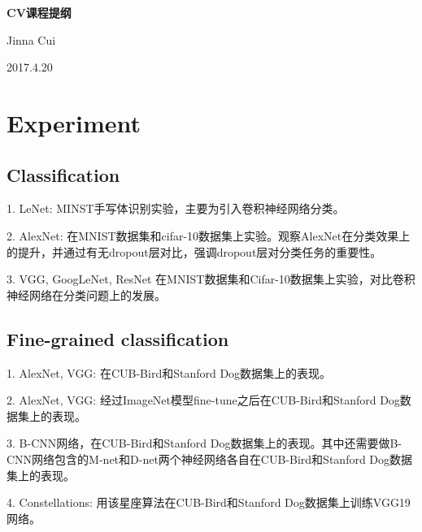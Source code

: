 \documentclass[UTF8]{article}
\begin{document}

\begin{center}
\textbf{\LARGE{CV课程提纲}} %
\end{center}

\begin{center}
Jinna Cui
\end{center}

\begin{center}
2017.4.20
\end{center}
\section{Experiment}
\subsection{Classification}
1. LeNet: MINST手写体识别实验，主要为引入卷积神经网络分类。

2. AlexNet: 在MNIST数据集和cifar-10数据集上实验。观察AlexNet在分类效果上的提升，并通过有无dropout层对比，强调dropout层对分类任务的重要性。

3. VGG, GoogLeNet, ResNet 在MNIST数据集和Cifar-10数据集上实验，对比卷积神经网络在分类问题上的发展。
\subsection{Fine-grained classification}
1. AlexNet, VGG: 在CUB-Bird和Stanford Dog数据集上的表现。

2. AlexNet, VGG: 经过ImageNet模型fine-tune之后在CUB-Bird和Stanford Dog数据集上的表现。

3. B-CNN网络，在CUB-Bird和Stanford Dog数据集上的表现。其中还需要做B-CNN网络包含的M-net和D-net两个神经网络各自在CUB-Bird和Stanford Dog数据集上的表现。

4. Constellations: 用该星座算法在CUB-Bird和Stanford Dog数据集上训练VGG19网络。
\end{document}
